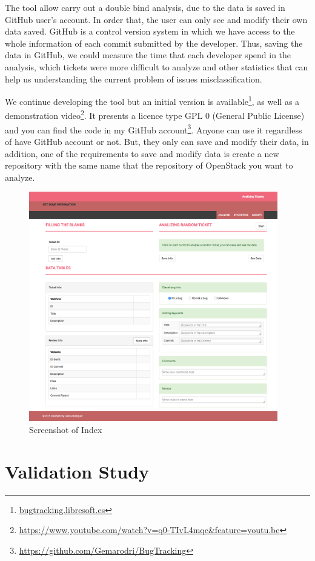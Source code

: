 \documentclass[ifip]{svmult}
\begin{document}
The tool allow carry out a double bind analysis, due to the data is saved in GitHub user's account. In order that, the user can only see and modify their own data saved. GitHub is a control version system in which we have access to the whole information of each commit submitted by the developer. Thus, saving the data in GitHub, we could measure the time that each developer spend in the analysis, which tickets were more difficult to analyze and other statistics that can help us understanding the current problem of issues misclassification.

We continue developing the tool but an initial version is available\footnote{\url{bugtracking.libresoft.es}}, as well as a demonstration video\footnote{\url{https://www.youtube.com/watch?v=q0-TIvL4mqc&feature=youtu.be}}. It presents a licence type GPL 0 (General Public License) and you can find the code in my GitHub account\footnote{\url{https://github.com/Gemarodri/BugTracking}}. Anyone can use it regardless of have GitHub account or not. But, they only can save and modify their data, in addition, one of the requirements to save and modify data is create a new repository with the same name that the repository of OpenStack you want to analyze. 

\begin{figure}
\centering
\includegraphics[height=10cm]{index.png}
\caption{Screenshot of Index}
\label{fig:2}       %
\end{figure}


\section{Validation Study} 
\label{sec:3}
\end{document}
